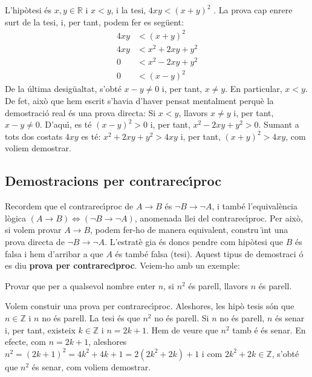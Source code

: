 \begin{solucio}
L'hip\`{o}tesi \'{e}s $x,y\in\mathbb{R}$ i $x<y$, i la tesi, $4xy<(x+y)^{2}$%
. La prova cap enrere surt de la tesi, i, per tant, podem fer es seg\"{u}ent:%
\begin{align*}
4xy & <(x+y)^{2} \\
4xy & <x^{2}+2xy+y^{2} \\
0 & <x^{2}-2xy+y^{2} \\
0 & <(x-y)^{2}
\end{align*}
De la \'{u}ltima desig\"{u}altat, s'obt\'{e} $x-y\neq0$ i, per tant, $x\neq y
$. En particular, $x<y$. De fet, aix\`{o} que hem escrit s'havia d'haver
pensat mentalment perqu\`{e} la demostraci\'{o} real \'{e}s una prova
directa: Si $x<y$, llavors $x\neq y$ i, per tant, $x-y\neq0$. D'aqu\'{\i},
es t\'{e} $(x-y)^{2}>0$ i, per tant, $x^{2}-2xy+y^{2}>0$. Sumant a tots dos
costats $4xy$ es t\'{e}: $x^{2}+2xy+y^{2}>4xy$ i, per tant, $(x+y)^{2}>4xy$,
com voliem demostrar.
\end{solucio}

\subsection{Demostracions per contrarec\'{\i}proc}

Recordem que el contrarec\'{\i}proc de $A\longrightarrow B$ \'{e}s $\lnot
B\longrightarrow\lnot A$, i tamb\'{e} l'equival\`{e}ncia l\`{o}gica $\left(
A\longrightarrow B\right) \Longleftrightarrow\left( \lnot B\longrightarrow
\lnot A\right) $, anomenada llei del contrarec\'{\i}proc. Per aix\`{o}, si
volem provar $A\longrightarrow B$, podem fer-ho de manera equivalent, constru%
\"{\i}nt una prova directa de $\lnot B\longrightarrow\lnot A$. L'estrat\`{e}%
gia \'{e}s doncs pendre com hip\`{o}tesi que $B$ \'{e}s falsa i hem
d'arribar a que $A$ \'{e}s tamb\'{e} falsa (tesi). Aquest tipus de demostraci%
\'{o} es diu \textbf{prova per contrarec\'{\i}proc}. Veiem-ho amb un exemple:

\begin{exem}
\label{3}Provar que per a qualsevol nombre enter $n$, si $n^{2}$ \'{e}s
parell, llavors $n$ \'{e}s parell.
\end{exem}

\begin{solucio}
Volem constuir una prova per contrarec\'{\i}proc. Aleshores, les hip\`{o}%
tesis s\'{o}n que $n\in\mathbb{Z}$ i $n$ no \'{e}s parell. La tesi \'{e}s
que $n^{2}$ no \'{e}s parell. Si $n$ no \'{e}s parell, $n$ \'{e}s senar i,
per tant, existeix $k\in\mathbb{Z}$ i $n=2k+1$. Hem de veure que $n^{2}$ tamb%
\'{e} \'{e}s senar. En efecte, com $n=2k+1$, aleshores $n^{2}=\left(
2k+1\right) ^{2}=4k^{2}+4k+1=2\left( 2k^{2}+2k\right) +1$ i com $2k^{2}+2k\in%
\mathbb{Z}$, s'obt\'{e} que $n^{2}$ \'{e}s senar, com voliem demostrar.
\end{solucio}

